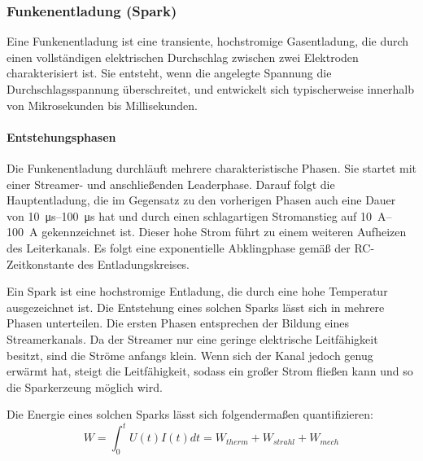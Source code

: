 \subsubsection{Funkenentladung (Spark)}
Eine Funkenentladung ist eine transiente, hochstromige Gasentladung, die durch einen vollständigen elektrischen Durchschlag zwischen zwei Elektroden charakterisiert ist. Sie entsteht, wenn die angelegte Spannung die Durchschlagsspannung überschreitet, und entwickelt sich typischerweise innerhalb von Mikrosekunden bis Millisekunden. \newline

\paragraph{Entstehungsphasen}\newline
Die Funkenentladung durchläuft mehrere charakteristische Phasen. Sie startet mit einer Streamer- und anschließenden Leaderphase. Darauf folgt die Hauptentladung, die im Gegensatz zu den vorherigen Phasen auch eine Dauer von \SIrange{10}{100}{\micro\second} hat und durch einen schlagartigen Stromanstieg auf \SIrange{10}{100}{\ampere} gekennzeichnet ist. Dieser hohe Strom führt zu einem weiteren Aufheizen des Leiterkanals. Es folgt eine exponentielle Abklingphase gemäß der RC-Zeitkonstante des Entladungskreises.

Ein Spark ist eine hochstromige Entladung, die durch eine hohe Temperatur ausgezeichnet ist. Die Entstehung eines solchen Sparks lässt sich in mehrere Phasen unterteilen. Die ersten Phasen entsprechen der Bildung eines Streamerkanals. Da der Streamer nur eine geringe elektrische Leitfähigkeit besitzt, sind die Ströme anfangs klein. Wenn sich der Kanal jedoch genug erwärmt hat, steigt die Leitfähigkeit, sodass ein großer Strom fließen kann und so die Sparkerzeung möglich wird.

Die Energie eines solchen Sparks lässt sich folgendermaßen quantifizieren:
\begin{equation}
    W = \int_{0}^{t} U(t)I(t)dt = W_{therm} + W_{strahl} + W_{mech}
\end{equation}

